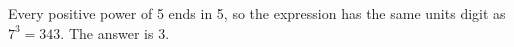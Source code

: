 Every positive power of 5 ends in 5, so the expression has the same units digit as $7^3=343$. The answer is $\boxed3$.
